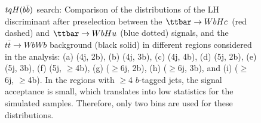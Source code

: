 \begin{figure}[htbp]
\begin{center}
 \\
 \\
\caption{$tqH(b\bar{b})$ search: Comparison of the distributions of the LH discriminant after preselection 
between the $\Hc$ (red dashed) and $\Hu$ (blue dotted) signals, 
and the $t\bar{t}\to WbWb$ background (black solid) in different regions considered in the analysis:
(a) (4j, 2b), (b) (4j, 3b), (c) (4j, 4b), (d) (5j, 2b), (e) (5j, 3b), (f) (5j, $\geq$4b), (g) ($\geq$6j, 2b), 
(h) ($\geq$6j, 3b), and (i) ($\geq$6j, $\geq$4b). 
In the regions with $\geq$4 $b$-tagged jets, the signal acceptance is small, which translates
into low statistics for the simulated samples. Therefore, only two bins are used for these distributions.} 
\label{fig:LHD}
\end{center}
\end{figure}



